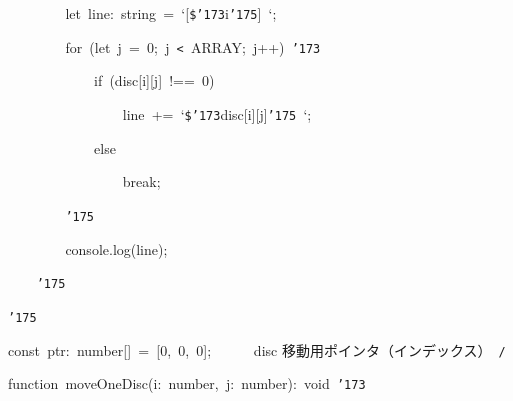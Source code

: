 \documentclass[a4paper,10pt]{article}
\def\mc{\relax}
\begin{document}
\noindent
\mbox{}{\tt\mc \ }{\tt\mc \ }{\tt\mc \ }{\tt\mc \ }{\tt\mc \ }{\tt\mc \ }{\tt\mc \ }{\tt\mc \ }let{\tt\mc \ }line:{\tt\mc \ }string{\tt\mc \ }={\tt\mc \ }`[{\tt\$}{\tt\char'173}i{\tt\char'175}]{\tt\mc \ }`;

\noindent
\mbox{}{\tt\mc \ }{\tt\mc \ }{\tt\mc \ }{\tt\mc \ }{\tt\mc \ }{\tt\mc \ }{\tt\mc \ }{\tt\mc \ }for{\tt\mc \ }(let{\tt\mc \ }j{\tt\mc \ }={\tt\mc \ }0;{\tt\mc \ }j{\tt\mc \ }{\tt <}{\tt\mc \ }ARRAY;{\tt\mc \ }j++){\tt\mc \ }{\tt\char'173}

\noindent
\mbox{}{\tt\mc \ }{\tt\mc \ }{\tt\mc \ }{\tt\mc \ }{\tt\mc \ }{\tt\mc \ }{\tt\mc \ }{\tt\mc \ }{\tt\mc \ }{\tt\mc \ }{\tt\mc \ }{\tt\mc \ }if{\tt\mc \ }(disc[i][j]{\tt\mc \ }!=={\tt\mc \ }0)

\noindent
\mbox{}{\tt\mc \ }{\tt\mc \ }{\tt\mc \ }{\tt\mc \ }{\tt\mc \ }{\tt\mc \ }{\tt\mc \ }{\tt\mc \ }{\tt\mc \ }{\tt\mc \ }{\tt\mc \ }{\tt\mc \ }{\tt\mc \ }{\tt\mc \ }{\tt\mc \ }{\tt\mc \ }line{\tt\mc \ }+={\tt\mc \ }`{\tt\$}{\tt\char'173}disc[i][j]{\tt\char'175}{\tt\mc \ }`;

\noindent
\mbox{}{\tt\mc \ }{\tt\mc \ }{\tt\mc \ }{\tt\mc \ }{\tt\mc \ }{\tt\mc \ }{\tt\mc \ }{\tt\mc \ }{\tt\mc \ }{\tt\mc \ }{\tt\mc \ }{\tt\mc \ }else

\noindent
\mbox{}{\tt\mc \ }{\tt\mc \ }{\tt\mc \ }{\tt\mc \ }{\tt\mc \ }{\tt\mc \ }{\tt\mc \ }{\tt\mc \ }{\tt\mc \ }{\tt\mc \ }{\tt\mc \ }{\tt\mc \ }{\tt\mc \ }{\tt\mc \ }{\tt\mc \ }{\tt\mc \ }break;

\noindent
\mbox{}{\tt\mc \ }{\tt\mc \ }{\tt\mc \ }{\tt\mc \ }{\tt\mc \ }{\tt\mc \ }{\tt\mc \ }{\tt\mc \ }{\tt\char'175}

\noindent
\mbox{}{\tt\mc \ }{\tt\mc \ }{\tt\mc \ }{\tt\mc \ }{\tt\mc \ }{\tt\mc \ }{\tt\mc \ }{\tt\mc \ }console.log(line);

\noindent
\mbox{}{\tt\mc \ }{\tt\mc \ }{\tt\mc \ }{\tt\mc \ }{\tt\char'175}

\noindent
\mbox{}{\tt\char'175}

\noindent
\mbox{}\hfill

\noindent
\mbox{}const{\tt\mc \ }ptr:{\tt\mc \ }number[]{\tt\mc \ }={\tt\mc \ }[0,{\tt\mc \ }0,{\tt\mc \ }0];{\tt\mc \ }{\tt\mc \ }{\tt\mc \ }{\tt\mc \ }\rm\mc {\tt /}{\tt *}\  \ disc 移動用ポインタ（インデックス）\hfill \rm\mc \ {\tt *}{\tt /}
\tt\mc 

\noindent
\mbox{}\hfill

\noindent
\mbox{}function{\tt\mc \ }moveOneDisc(i:{\tt\mc \ }number,{\tt\mc \ }j:{\tt\mc \ }number):{\tt\mc \ }void{\tt\mc \ }{\tt\char'173}
\end{document}
